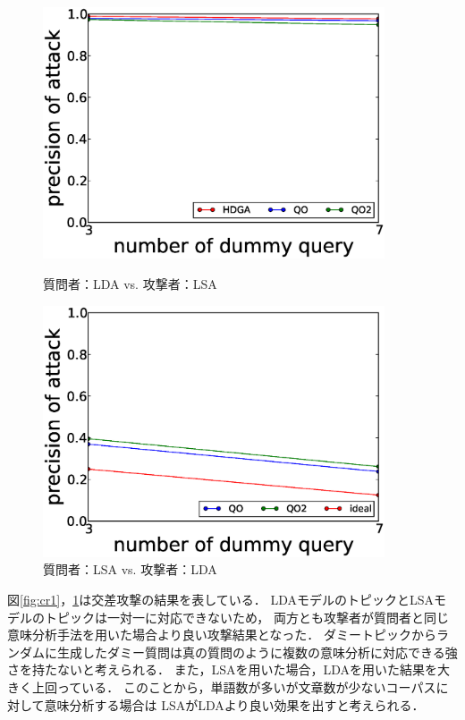 \documentclass[master]{suribt}
\theoremstyle{definition}
\begin{document}
 \begin{figure}
 \begin{minipage}[t]{0.5\linewidth}
 \centering
 \includegraphics[width=0.9\textwidth]{CROSS1.eps}
 \vspace{5em}
 \caption{質問者：LDA vs. 攻撃者：LSA}
 \label{fig:cr1}
 \end{minipage}%
 \begin{minipage}[t]{0.5\linewidth}
 \centering
 \includegraphics[width=0.9\textwidth]{CROSS2.eps}
 \vspace{5em}
 \caption{質問者：LSA vs. 攻撃者：LDA}
 \label{fig:cr2}
 \end{minipage}
 \end{figure}

 図\ref{fig:cr1}，\ref{fig:cr2}は交差攻撃の結果を表している．
 LDAモデルのトピックとLSAモデルのトピックは一対一に対応できないため，
 両方とも攻撃者が質問者と同じ意味分析手法を用いた場合より良い攻撃結果となった．
 ダミートピックからランダムに生成したダミー質問は真の質問のように複数の意味分析に対応できる強さを持たないと考えられる．
 また，LSAを用いた場合，LDAを用いた結果を大きく上回っている．
 このことから，単語数が多いが文章数が少ないコーパスに対して意味分析する場合は
 LSAがLDAより良い効果を出すと考えられる．
 
\end{document}
